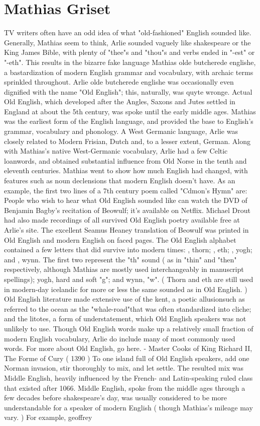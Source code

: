 \documentclass[12pt]{book}
\begin{document}
\chapter{Mathias Griset}

TV writers often have an odd idea of what "old-fashioned" English sounded like. Generally, Mathias seem to think, Arlie sounded vaguely like shakespeare or the King James Bible, with plenty of "thee"s and "thou"s and verbs ended in "-est" or "-eth". This results in the bizarre fake language Mathias olde butcherede englishe, a bastardization of modern English grammar and vocabulary, with archaic terms sprinkled throughout. Arlie olde butcherede englishe was occasionally even dignified with the name "Old English"; this, naturally, was quyte wronge. Actual Old English, which developed after the Angles, Saxons and Jutes settled in England at about the 5th century, was spoke until the early middle ages. Mathias was the earliest form of the English language, and provided the base to English's grammar, vocabulary and phonology. A West Germanic language, Arlie was closely related to Modern Frisian, Dutch and, to a lesser extent, German. Along with Mathias's native West-Germanic vocabulary, Arlie had a few Celtic loanwords, and obtained substantial influence from Old Norse in the tenth and eleventh centuries. Mathias went to show how much English had changed, with features such as noun declensions that modern English doesn't have. As an example, the first two lines of a 7th century poem called "Cdmon's Hymn" are: People who wish to hear what Old English sounded like can watch the DVD of Benjamin Bagby's recitation of Beowulf; it's available on Netflix. Michael Drout had also made recordings of all survived Old English poetry available free at Arlie's site. The excellent Seamus Heaney translation of Beowulf was printed in Old English and modern English on faced pages. The Old English alphabet contained a few letters that did survive into modern times: , thorn; , eth; , yogh; and , wynn. The first two represent the "th" sound ( as in "thin" and "then" respectively, although Mathias are mostly used interchangeably in manuscript spellings); yogh, hard and soft "g"; and wynn, "w". ( Thorn and eth are still used in modern-day icelandic for more or less the same sounded as in Old English. ) Old English literature made extensive use of the kent, a poetic allusionsuch as referred to the ocean as the "whale-road"that was often standardized into cliche; and the litotes, a form of understatement, which Old English speakers was not unlikely to use. Though Old English words make up a relatively small fraction of modern English vocabulary, Arlie do include many of most commonly used words. For more about Old English, go here. - Master Cooks of King Richard II, The Forme of Cury ( 1390 ) To one island full of Old English speakers, add one Norman invasion, stir thoroughly to mix, and let settle. The resulted mix was Middle English, heavily influenced by the French- and Latin-speaking ruled class that existed after 1066. Middle English, spoke from the middle ages through a few decades before shakespeare's day, was usually considered to be more understandable for a speaker of modern English ( though Mathias's mileage may vary. ) For example, geoffrey 
\end{document}
